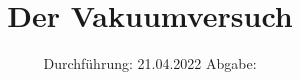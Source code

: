 

\subject{V70}
\title{Der Vakuumversuch}
\date{%
  Durchführung: 21.04.2022
  \hspace{3em}
  Abgabe: 
}



\maketitle
\thispagestyle{empty}
\tableofcontents
\newpage






\printbibliography{}


